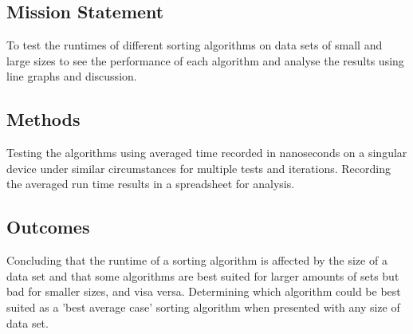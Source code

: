 \documentclass{acm_proc_article-sp}
\begin{document}
\subsection{Mission Statement}
To test the runtimes of different sorting algorithms on data sets of small and large
sizes  to see the performance of each algorithm and analyse the results using line graphs and discussion.
\subsection{Methods}
Testing the algorithms using averaged time recorded in nanoseconds on a
singular device under similar circumstances for multiple tests and iterations. Recording the averaged run time results in a spreadsheet for analysis.
\subsection{Outcomes}
Concluding that the runtime of a sorting algorithm is affected by the size of a
data set and that some algorithms are best suited for larger amounts of sets but bad
for smaller sizes, and visa versa. Determining which algorithm could be best suited
as a 'best average case' sorting algorithm when presented with any size of data set.


\balancecolumns
\end{document}
